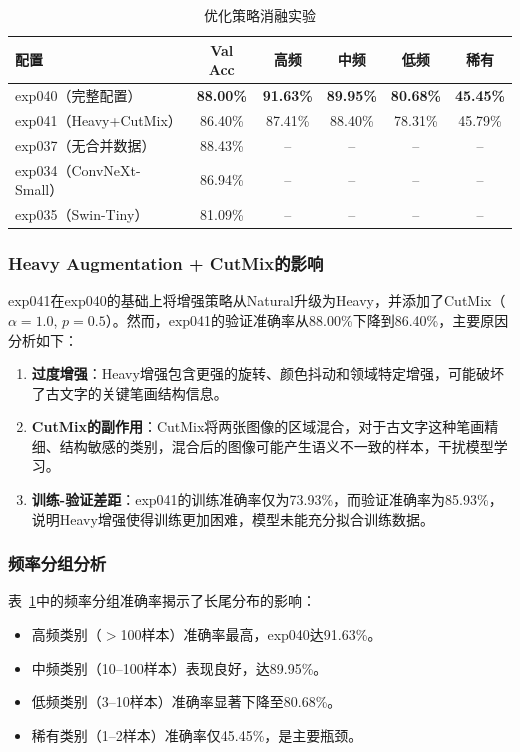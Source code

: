\documentclass[12pt,a4paper]{article}
\begin{document}
\begin{table}[H]
\centering
\caption{优化策略消融实验}
\label{tab:ablation}
\begin{tabular}{lccccc}
\toprule
\textbf{配置} & \textbf{Val Acc} & \textbf{高频} & \textbf{中频} & \textbf{低频} & \textbf{稀有} \\
\midrule
exp040（完整配置） & \textbf{88.00\%} & \textbf{91.63\%} & \textbf{89.95\%} & \textbf{80.68\%} & \textbf{45.45\%} \\
exp041（Heavy+CutMix） & 86.40\% & 87.41\% & 88.40\% & 78.31\% & 45.79\% \\
exp037（无合并数据） & 88.43\% & -- & -- & -- & -- \\
exp034（ConvNeXt-Small） & 86.94\% & -- & -- & -- & -- \\
exp035（Swin-Tiny） & 81.09\% & -- & -- & -- & -- \\
\bottomrule
\end{tabular}
\end{table}

\subsubsection{Heavy Augmentation + CutMix的影响}

exp041在exp040的基础上将增强策略从Natural升级为Heavy，并添加了CutMix（$\alpha=1.0$, $p=0.5$）。然而，exp041的验证准确率从88.00\%下降到86.40\%，主要原因分析如下：

\begin{enumerate}
    \item \textbf{过度增强}：Heavy增强包含更强的旋转、颜色抖动和领域特定增强，可能破坏了古文字的关键笔画结构信息。
    \item \textbf{CutMix的副作用}：CutMix将两张图像的区域混合，对于古文字这种笔画精细、结构敏感的类别，混合后的图像可能产生语义不一致的样本，干扰模型学习。
    \item \textbf{训练-验证差距}：exp041的训练准确率仅为73.93\%，而验证准确率为85.93\%，说明Heavy增强使得训练更加困难，模型未能充分拟合训练数据。
\end{enumerate}

\subsubsection{频率分组分析}

表~\ref{tab:ablation}中的频率分组准确率揭示了长尾分布的影响：
\begin{itemize}
    \item 高频类别（$>$100样本）准确率最高，exp040达91.63\%。
    \item 中频类别（10--100样本）表现良好，达89.95\%。
    \item 低频类别（3--10样本）准确率显著下降至80.68\%。
    \item 稀有类别（1--2样本）准确率仅45.45\%，是主要瓶颈。
\end{itemize}
\end{document}
